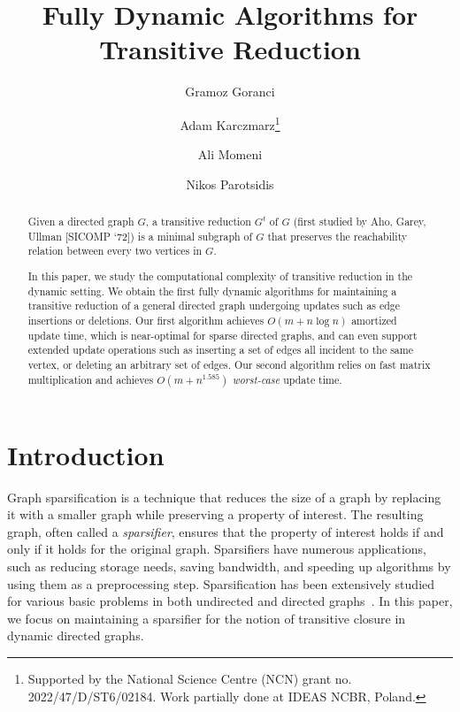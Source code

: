 \documentclass[11pt]{article}
\title{Fully Dynamic Algorithms for Transitive Reduction}
\author[1]{Gramoz Goranci}
\author[2]{Adam Karczmarz\thanks{Supported by the National Science Centre (NCN) grant no. 2022/47/D/ST6/02184. Work partially done at IDEAS NCBR, Poland.}}
\author[3]{Ali Momeni}
\author[4]{Nikos Parotsidis}
\affil[1]{Faculty of Computer Science, University of Vienna, Austria}
\affil[2]{University of Warsaw}
\affil[3]{Faculty of Computer Science, UniVie Doctoral School Computer Science DoCS, University of Vienna, Austria}
\affil[4]{Google Research, Switzerland}
\date{}
\newcommand{\arxivVsConference}[2]{#1}
\begin{document}
\maketitle

\arxivVsConference{
}{}




\begin{abstract}
 Given a directed graph $G$, a transitive reduction $G^t$ of $G$ (first studied by Aho, Garey, Ullman [SICOMP `72]) is a minimal subgraph of $G$ that preserves the reachability relation between every two vertices in $G$.
 
 In this paper, we study the computational complexity of transitive reduction in the dynamic setting.
 We obtain the first fully dynamic algorithms for maintaining a transitive reduction of a general directed graph undergoing updates such as edge insertions or deletions.
 Our first algorithm achieves $O(m+n \log n)$ amortized update time, which is near-optimal for sparse directed graphs, and can even support extended update operations such as inserting a set of edges all incident to the same vertex, or deleting an arbitrary set of edges. Our second algorithm relies on fast matrix multiplication and achieves $O(m+ n^{1.585})$ \emph{worst-case} update time.   

\end{abstract}


 
\arxivVsConference{
\newpage
{}
}{}



\section{Introduction}
Graph sparsification is a technique that reduces the size of a graph by replacing it with a smaller graph while preserving a property of interest. The resulting graph, often called a \emph{sparsifier}, ensures that the property of interest holds if and only if it holds for the original graph.
Sparsifiers have numerous applications, such as reducing storage needs, saving bandwidth, and speeding up algorithms by using them as a preprocessing step.
Sparsification has been extensively studied for various basic problems in both undirected and directed graphs~\cite{Aho:1972aa, althofer1993sparse, benczur1996approximating, cheriyan2000approximating, spielman2011spectral, spielman2008graph}. In this paper, we focus on maintaining a sparsifier for the notion of transitive closure in dynamic directed graphs.
\end{document}

